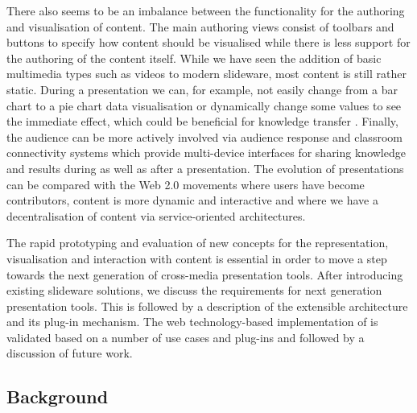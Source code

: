     There also seems to be an imbalance between the functionality for the
    authoring and visualisation of content. The main authoring views consist of
    toolbars and buttons to specify how content should be visualised while
    there is less support for the authoring of the content itself. While we
    have seen the addition of basic multimedia types such as videos to modern
    slideware, most content is still rather static. During a presentation we
    can, for example, not easily change from a bar chart to a pie chart data
    visualisation or dynamically change some values to see the immediate
    effect, which could be beneficial for knowledge transfer
    \citep{holzinger-1}. Finally, the audience can be more actively involved
    via audience response and classroom connectivity systems which provide
    multi-device interfaces for sharing knowledge and results during as well as
    after a presentation. The evolution of presentations can be compared with
    the Web 2.0 movements where users have become contributors, content is more
    dynamic and interactive and where we have a decentralisation of content via
    service-oriented architectures.

    The rapid prototyping and evaluation of new concepts for the
    representation, visualisation and interaction with content is essential in
    order to move a step towards the next generation of cross-media
    presentation tools. After introducing existing slideware solutions, we
    discuss the requirements for next generation presentation tools. This is
    followed by a description of the extensible \mxp architecture and its
    plug-in mechanism. The web technology-based implementation of \mxp is
    validated based on a number of use cases and \mxp plug-ins and followed by
    a discussion of future work.

   \subsection{Background}

